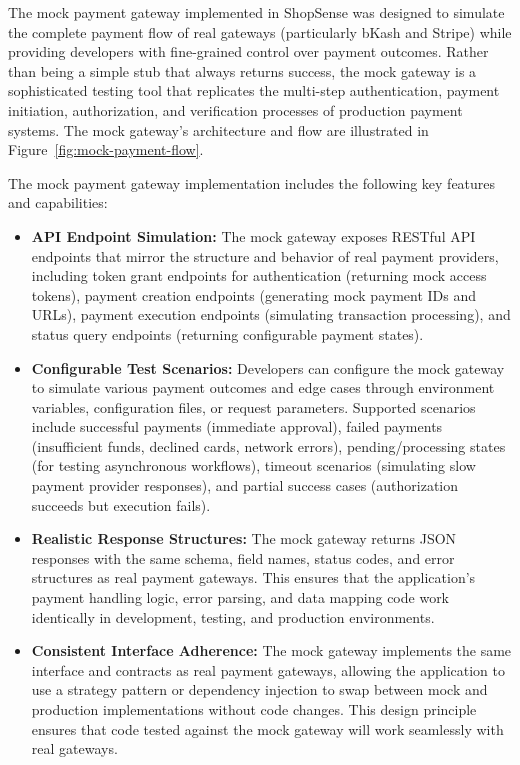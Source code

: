 The mock payment gateway implemented in ShopSense was designed to simulate the complete payment flow of real gateways (particularly bKash and Stripe) while providing developers with fine-grained control over payment outcomes. Rather than being a simple stub that always returns success, the mock gateway is a sophisticated testing tool that replicates the multi-step authentication, payment initiation, authorization, and verification processes of production payment systems. The mock gateway's architecture and flow are illustrated in Figure~\ref{fig:mock-payment-flow}.

The mock payment gateway implementation includes the following key features and capabilities:

\begin{itemize}
  \item \textbf{API Endpoint Simulation:} The mock gateway exposes RESTful API endpoints that mirror the structure and behavior of real payment providers, including token grant endpoints for authentication (returning mock access tokens), payment creation endpoints (generating mock payment IDs and URLs), payment execution endpoints (simulating transaction processing), and status query endpoints (returning configurable payment states).
  
  \item \textbf{Configurable Test Scenarios:} Developers can configure the mock gateway to simulate various payment outcomes and edge cases through environment variables, configuration files, or request parameters. Supported scenarios include successful payments (immediate approval), failed payments (insufficient funds, declined cards, network errors), pending/processing states (for testing asynchronous workflows), timeout scenarios (simulating slow payment provider responses), and partial success cases (authorization succeeds but execution fails).
  
  \item \textbf{Realistic Response Structures:} The mock gateway returns JSON responses with the same schema, field names, status codes, and error structures as real payment gateways. This ensures that the application's payment handling logic, error parsing, and data mapping code work identically in development, testing, and production environments.
  
  \item \textbf{Consistent Interface Adherence:} The mock gateway implements the same interface and contracts as real payment gateways, allowing the application to use a strategy pattern or dependency injection to swap between mock and production implementations without code changes. This design principle ensures that code tested against the mock gateway will work seamlessly with real gateways.
  

\end{itemize}
